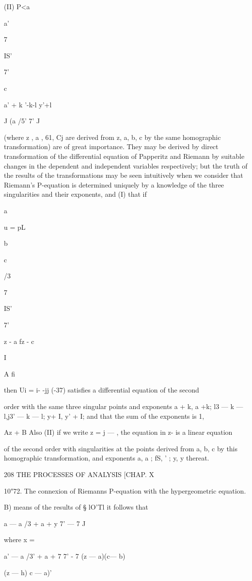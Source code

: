 (II) P<a

a'

  

7

IS'

7'

c

a' + k '-k-l y'+l

J (a /5' 7' J

(where z , a , 61, Cj are derived from z, a, b, c by the same
homographic transformation) are of great importance. They may be
derived by direct transformation of the differential equation of
Papperitz and Riemann by suitable changes in the dependent and
independent variables respectively; but the truth of the results of
the transformations may be seen intuitively when we consider that
Riemann's P-equation is determined uniquely by a knowledge of the
three singularities and their exponents, and (I) that if

a

u = pL

b

c

/3

7

IS'

7'

z - a\* fz - c\

I

A fi

then Ui = i- -jj (-37) satisfies a differential equation of the second

order with the same three singular points and exponents a + k, a +k;
l3 — k — l,j3' — k — l; y+ I, y' + I; and that the sum of the
exponents is 1,

Az + B Also (II) if we write z = j — , the equation in z- is a linear
equation

of the second order with singularities at the points derived from a,
b, c by this homographic transformation, and exponents a, a ; fS, ' ;
y, y thereat.

208 THE PROCESSES OF ANALYSIS [CHAP. X

10"72. The connexion of Riemanns P-equation with the hypergeometric
equation.

B) means of the results of § lO'Tl it follows that

 a — a /3 + a + y 7' — 7 J

where x =

a' — a /3' + a + 7 7' - 7 (z — a)(c— b)

(z — h) c — a)'

